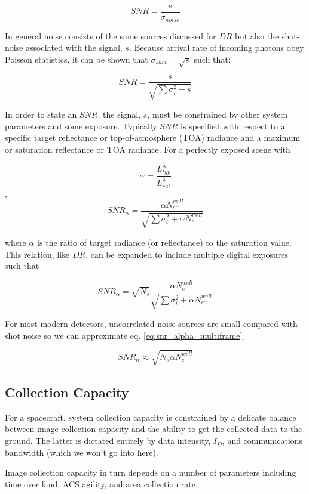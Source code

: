 \documentclass[10pt,journal]{IEEEtran}  %
\begin{document}
$$SNR = \frac{s}{\sigma_{noise}}$$

In general noise consists of the same sources discussed for $DR$ but also the shot-noise associated with the signal, $s$.  Because arrival rate of incoming photons obey Poisson statistics, it can be shown that $\sigma_{shot} = \sqrt{s}$ such that:

$$SNR = \frac{s}{\sqrt{\sum{\sigma_i^2} + s}}$$

In order to state an $SNR$, the signal, $s$, must be constrained by other system parameters and some exposure.  Typically $SNR$ is specified with respect to a specific target reflectance or top-of-atmosphere (TOA) radiance and a maximum or saturation reflectance or TOA radiance.  For a perfectly exposed scene with

$$\alpha = \frac{L_{typ}^\lambda}{L_{sat}^\lambda}$$
,
$$SNR_{\alpha} = \frac{\alpha N_{e^-}^{well}}{\sqrt{\sum{\sigma_i^2} + \alpha N_{e^-}^{well}}}$$

where $\alpha$ is the ratio of target radiance (or reflectance) to the saturation value.  This relation, like $DR$, can be expanded to include multiple digital exposures such that

\begin{equation}
\label{eq:snr_alpha_multiframe}
SNR_{\alpha} = \sqrt{N_s}\frac{\alpha N_{e^-}^{well}}{\sqrt{\sum{\sigma_i^2} + \alpha N_{e^-}^{well}}}
\end{equation}

For most modern detectors, uncorrelated noise sources are small compared with shot noise so we can approximate eq. \ref{eq:snr_alpha_multiframe}

\begin{equation}
\label{eq:snr_alpha_multiframe_simp}
SNR_{\alpha} \approx \sqrt{N_s \alpha N_{e^-}^{well}}
\end{equation}

\subsection{Collection Capacity}
\label{sec:capacity}
For a spacecraft, system collection capacity is constrained by a delicate balance between image collection capacity and the ability to get the collected data to the ground.  The latter is dictated entirely by data intensity, $I_D$, and communications bandwidth (which we won't go into here).  

Image collection capacity in turn depends on a number of parameters including time over land, ACS agility, and area collection rate,
\end{document}
